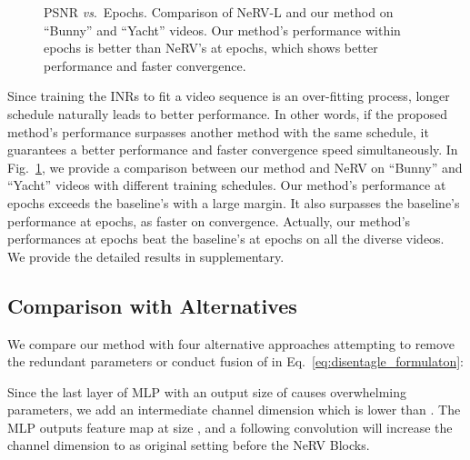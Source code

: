 \documentclass[runningheads]{llncs}
\begin{document}
\begin{figure}[t]
\centering
    \caption{PSNR \emph{vs}.\ Epochs. Comparison of NeRV-L and our method on ``Bunny'' and ``Yacht'' videos. Our method's performance within  epochs is better than NeRV's at  epochs, which shows better performance and faster convergence.}
    
    \label{fig:psnr_epochs}
\end{figure}

Since training the INRs to fit a video sequence is an over-fitting process, longer schedule naturally leads to better performance. In other words, if the proposed method's performance surpasses another method with the same schedule, it guarantees a better performance and faster convergence speed simultaneously. In Fig.~\ref{fig:psnr_epochs}, we provide a comparison between our method and NeRV on ``Bunny'' and ``Yacht'' videos with different training schedules. Our method's performance at  epochs exceeds the baseline's with a large margin. It also surpasses the baseline's performance at  epochs, as  faster on convergence. Actually, our method's performances at  epochs beat the baseline's at  epochs on all the diverse videos. We provide the detailed results in supplementary.

\subsection{Comparison with Alternatives}
\label{alternative exp}

We compare our method with four alternative approaches attempting to remove the redundant parameters or conduct fusion of  in Eq.~\ref{eq:disentagle_formulaton}:

 Since the last layer of MLP with an output size of  causes overwhelming parameters, we add an intermediate channel dimension  which is lower than . The MLP outputs feature map at size , and a following  convolution will increase the channel dimension to  as original setting before the NeRV Blocks.
\end{document}
